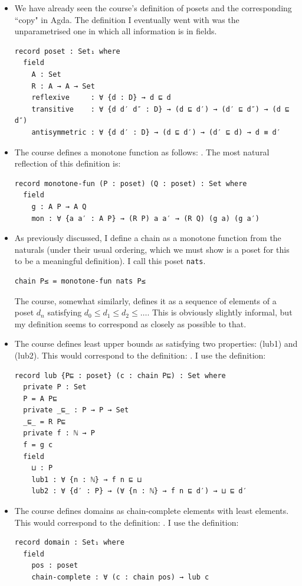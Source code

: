 \documentclass[12pt,a4paper,twoside,openright]{report}
\begin{document}
\begin{itemize}
\item We have already seen the course's definition of posets and the corresponding ``copy" in Agda. The definition I eventually went with was the unparametrised one in which all information is in fields. 
\begin{verbatim}
record poset : Set₁ where
  field
    A : Set
    R : A → A → Set
    reflexive     : ∀ {d : D} → d ⊑ d 
    transitive    : ∀ {d d′ d″ : D} → (d ⊑ d′) → (d′ ⊑ d″) → (d ⊑ d″)
    antisymmetric : ∀ {d d′ : D} → (d ⊑ d′) → (d′ ⊑ d) → d ≡ d′
\end{verbatim}
\item The course defines a monotone function as follows: . The most natural reflection of this definition is:
\begin{verbatim}
record monotone-fun (P : poset) (Q : poset) : Set where
  field
    g : A P → A Q
    mon : ∀ {a a′ : A P} → (R P) a a′ → (R Q) (g a) (g a′)
\end{verbatim}
\item As previously discussed, I define a chain as a monotone function from the naturals (under their usual ordering, which we must show is a poset for this to be a meaningful definition). I call this poset \texttt{nats}.
\begin{verbatim}
chain P≤ = monotone-fun nats P≤
\end{verbatim}
The course, somewhat similarly, defines it as a sequence of elements of a poset $d_n$ satisfying $d_0 \leq d_1 \leq d_2 \leq \hdots$. This is obviously slightly informal, but my definition seems to correspond as closely as possible to that.
\item
The course defines least upper bounds as satisfying two properties: (lub1) and (lub2). This would correspond to the definition: . I use the definition:
\begin{verbatim}
record lub {P⊑ : poset} (c : chain P⊑) : Set where
  private P : Set
  P = A P⊑
  private _⊑_ : P → P → Set
  _⊑_ = R P⊑
  private f : ℕ → P
  f = g c
  field
    ⊔ : P
    lub1 : ∀ {n : ℕ} → f n ⊑ ⊔
    lub2 : ∀ {d′ : P} → (∀ {n : ℕ} → f n ⊑ d′) → ⊔ ⊑ d′
\end{verbatim}
\item
The course defines domains as chain-complete elements with least elements. This would correspond to the definition: . I use the definition: 
\begin{verbatim}
record domain : Set₁ where
  field
    pos : poset
    chain-complete : ∀ (c : chain pos) → lub c

\end{verbatim}
\end{itemize}
\end{document}
